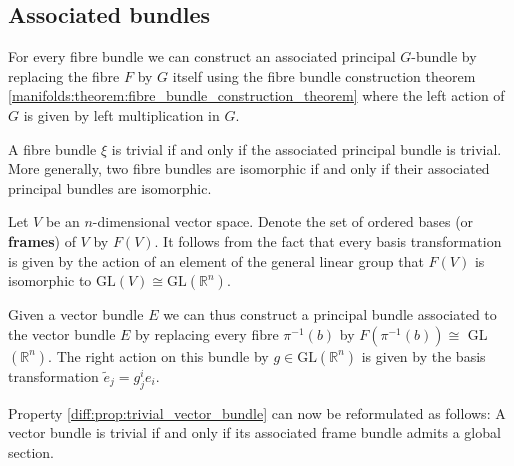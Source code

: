 
\subsection{Associated bundles}
	
	\begin{construct}
		For every fibre bundle we can construct an associated principal $G$-bundle by replacing the fibre $F$ by $G$ itself using the fibre bundle construction theorem \ref{manifolds:theorem:fibre_bundle_construction_theorem} where the left action of $G$ is given by left multiplication in $G$.
	\end{construct}	
	
	\begin{property}
		A fibre bundle $\xi$ is trivial if and only if the associated principal bundle is trivial. More generally, two fibre bundles are isomorphic if and only if their associated principal bundles are isomorphic.
	\end{property}
	
	\begin{example}\label{bundles:frame_bundle}
		Let $V$ be an $n$-dimensional vector space. Denote the set of ordered bases (or \textbf{frames}) of $V$ by $F(V)$. It follows from the fact that every basis transformation is given by the action of an element of the general linear group that $F(V)$ is isomorphic to $\text{GL}(V)\cong\text{GL}(\mathbb{R}^n)$.
		
		Given a vector bundle $E$ we can thus construct a principal bundle associated to the vector bundle $E$ by replacing every fibre $\pi^{-1}(b)$ by $F(\pi^{-1}(b))\cong$ GL$(\mathbb{R}^n)$. The right action on this bundle by $g\in\text{GL}(\mathbb{R}^n)$ is given by the basis transformation $\widetilde{e}_j = g^i_je_i$.
	\end{example}
	\begin{property}\label{diff:prop:trivial_vector_bundle_frames}
		Property \ref{diff:prop:trivial_vector_bundle} can now be reformulated as follows: A vector bundle is trivial if and only if its associated frame bundle admits a global section.
	\end{property}
	
